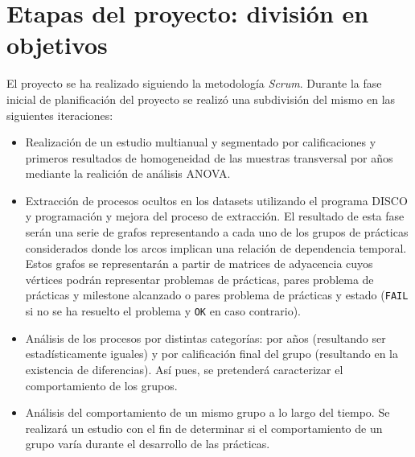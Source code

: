 \chapter{Etapas del proyecto: división en objetivos}\label{chapter:objetivos}

El proyecto se ha realizado siguiendo la metodología \emph{Scrum}. Durante la fase inicial de planificación del proyecto se realizó una subdivisión del mismo en las siguientes iteraciones:
\begin{itemize}
\item Realización de un estudio multianual y segmentado por calificaciones y primeros resultados de homogeneidad de las muestras transversal por años mediante la realición de análisis ANOVA.
\item Extracción de procesos ocultos en los datasets utilizando el programa DISCO y programación y mejora del proceso de extracción. El resultado de esta fase serán una serie de grafos representando a cada uno de los grupos de prácticas considerados donde los arcos implican una relación de dependencia temporal. Estos grafos se representarán a partir de matrices de adyacencia cuyos vértices podrán representar problemas de prácticas, pares problema de prácticas y milestone alcanzado o pares problema de prácticas y estado (\texttt{FAIL} si no se ha resuelto el problema y \texttt{OK} en caso contrario).
\item Análisis de los procesos por distintas categorías: por años (resultando ser estadísticamente iguales) y por calificación final del grupo (resultando en la existencia de diferencias). Así pues, se pretenderá caracterizar el comportamiento de los grupos.
\item Análisis del comportamiento de un mismo grupo a lo largo del tiempo. Se realizará un estudio con el fin de determinar si el comportamiento de un grupo varía durante el desarrollo de las prácticas.
\end{itemize}